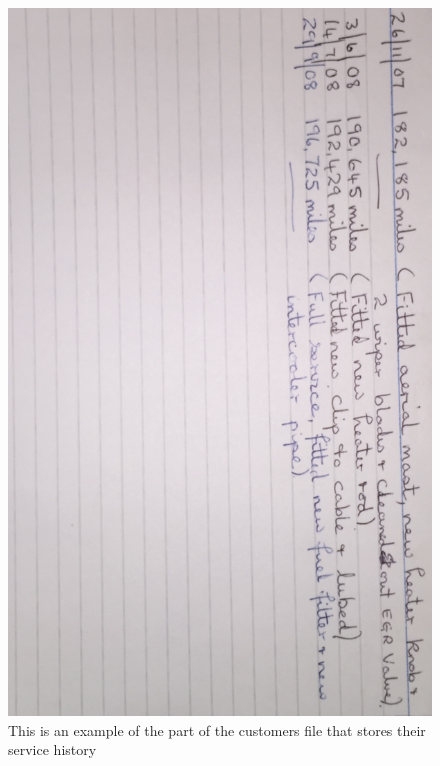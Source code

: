 \documentclass{article}
\begin{document}
\begin{figure}[H]
    \includegraphics[width=\textwidth]{image_2.jpeg}
    \caption{This is an example of the part of the customers file that stores their service history}
    
    \end{figure}
    \newpage
	
\end{document}

